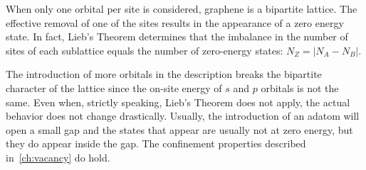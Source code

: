 %
%
%
%
%
%
%
%
%


When only one orbital per site is considered, graphene is a bipartite lattice. The effective removal of one of the sites results in the appearance of a zero energy state. In fact, Lieb's Theorem\cite{Lieb1989} determines that the imbalance in the number of sites of each sublattice equals the number of zero-energy states: $N_Z=|N_A-N_B|$.

The introduction of more orbitals in the description breaks the bipartite character of the lattice since the on-site energy of $s$ and $p$ orbitals is not the same. Even when, strictly speaking, Lieb's Theorem does not apply, the actual behavior does not change drastically.
Usually, the introduction of an adatom will open a small gap and the states that appear are usually not at zero energy, but they do appear inside the gap. The confinement properties described in~\ref{ch:vacancy} do hold.


